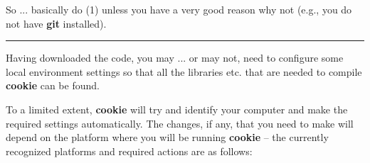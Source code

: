 \vspace{1mm} 
\noindent So ... basically do (1) unless you have a very good reason why not (e.g., you do not have \textbf{git} installed).

\vspace{1mm}\noindent\rule{4cm}{0.5pt}\vspace{2mm}

\newpage

\noindent Having downloaded the code, you may ... or may not, need to configure some local environment settings so that all the libraries etc. that are needed to compile \textbf{cookie} can be found.

To a limited extent, \textbf{cookie} will try and identify your computer and make the required settings automatically. The changes, if any, that you need to make will depend on the platform where you will be running \textbf{cookie} -- the currently recognized platforms and required actions are as follows:

